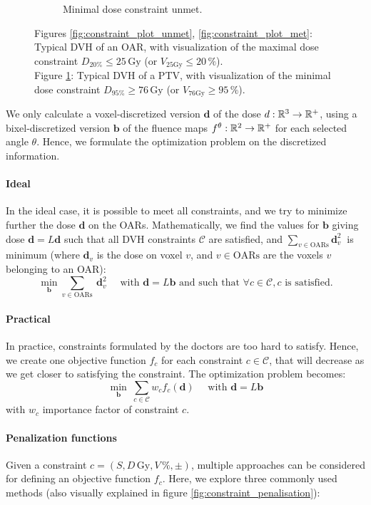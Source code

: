 \begin{figure}
\begin{subfigure}{0.32\textwidth}
		\caption{Minimal dose constraint unmet.}
		\label{fig:constraint_plot_min}
	\end{subfigure}
	\caption*{
		Figures \ref{fig:constraint_plot_unmet}, \ref{fig:constraint_plot_met}:
		Typical DVH of an OAR, with visualization of the maximal dose constraint $D_{20\%} \leq 25\,\text{Gy}$ (or $V_{25\text{Gy}} \leq 20\,\%$).\\
		Figure \ref{fig:constraint_plot_min}:
		Typical DVH of a PTV, with visualization of the minimal dose constraint $D_{95\%} \geq 76\,\text{Gy}$ (or $V_{76\text{Gy}} \geq 95\,\%$).
	}
	\label{fig:constraint_plot}
\end{figure}

We only calculate a voxel-discretized version $\mathbf{d}$ of the dose $d: \mathbb{R}^3 \to \mathbb{R}^+$, using a bixel-discretized version $\mathbf{b}$ of the fluence maps $f^\theta: \mathbb{R}^2 \to \mathbb{R}^+$ for each selected angle $\theta$.
Hence, we formulate the optimization problem on the discretized information.

\paragraph{Ideal}
In the ideal case, it is possible to meet all constraints, and we try to minimize further the dose $\mathbf{d}$ on the OARs.
Mathematically, we find the values for $\mathbf{b}$ giving dose $\mathbf{d} = L\mathbf{d}$ such that all DVH constraints $\mathcal{C}$ are satisfied, and $\sum_{v \in \text{OARs}} \mathbf{d}_v^2 \ $ is minimum (where $\mathbf{d}_v$ is the dose on voxel $v$, and $v \in \text{OARs}$ are the voxels $v$ belonging to an OAR):
$$
\min_{\mathbf{b}} \sum_{v \in \text{OARs}} \ \mathbf{d}_v^2
\quad \text{ with }
\mathbf{d} = L\mathbf{b}
\text{ and such that }
\forall c \in \mathcal{C}, c \text{ is satisfied.}
$$

\paragraph{Practical}
In practice, constraints formulated by the doctors are too hard to satisfy.
Hence, we create one objective function $f_c$ for each constraint $c \in \mathcal{C}$, that will decrease as we get closer to satisfying the constraint.
The optimization problem becomes:
$$
\min_{\mathbf{b}} \ \sum_{c \in \mathcal{C}} w_c f_c(\mathbf{d})
\quad \text{ with }
\mathbf{d} = L\mathbf{b}
$$
with $w_c$ importance factor of constraint $c$.

\paragraph{Penalization functions}
Given a constraint $c = \left( S, D\,\text{Gy}, V\,\%, \pm \right)$, multiple approaches can be considered for defining an objective function \( f_c \).
Here, we explore three commonly used methods (also visually explained in figure \ref{fig:constraint_penalisation}):

